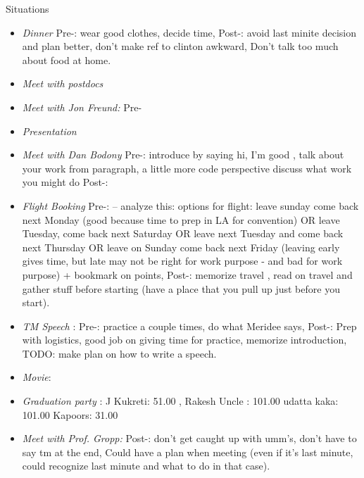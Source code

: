 \documentclass[serif, mathserif, final]{beamer}
\begin{document}
\begin{frame}{}
\begin{columns}
\begin{column}{0.20\linewidth}
\begin{block}{Situations}
\begin{itemize}
              \item \tiny \textit{Dinner} Pre-: wear good clothes,
                decide time, Post-: avoid last minite decision and
                plan better, don't make ref to clinton awkward, Don't
                talk too much about food at home. 
                \item \tiny \textit{Meet with postdocs}
                \item \tiny \textit{Meet with Jon Freund:} Pre- 
                \item \tiny \textit{Presentation} 
                \item \tiny \textit{Meet with Dan Bodony} Pre-:
                  introduce by saying hi, I'm good , talk about your
                  work from paragraph, a little more code perspective 
                  discuss what work you might do  Post-: 

                \item \tiny \textit{Flight Booking} Pre-: -- analyze
                  this: options for
                  flight: leave sunday come back next Monday (good
                  because time to prep in LA for convention) OR leave
                  Tuesday, come back next Saturday OR leave next
                  Tuesday and come back next Thursday OR leave on
                  Sunday come back next Friday (leaving early gives
                  time, but late may not be right for work purpose -
                  and bad for work purpose) + bookmark on points, Post-: memorize travel ,
                  read on travel and gather stuff before starting
                  (have a place that you pull up just before you
                  start). 

                \item \tiny \textit{TM Speech} : Pre-:  practice a
                  couple times, do what Meridee says, Post-: Prep with
                 logistics, good job on giving time for practice,
                 memorize introduction,  TODO: make plan on how to
                 write a speech. 

               \item \tiny \textit{Movie}: 

               \item \tiny 
                 \textit{ Graduation party }:  J Kukreti: 51.00 ,
                 Rakesh Uncle : 101.00 
                 udatta kaka: 101.00
                 Kapoors: 31.00


               \item \tiny \textit{Meet with Prof. Gropp: } Post-:
                 don't get caught up with umm's, don't have to say tm
                 at the end, Could have a plan when meeting (even if
                 it's last minute, could recognize last minute and what to
                 do in that case). 


\end{itemize}
\end{block}
\end{column}
\end{columns}
\end{frame}
\end{document}
